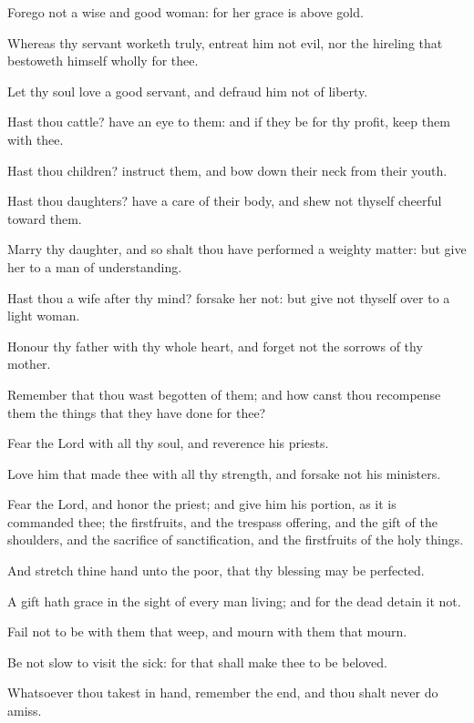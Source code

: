 {\par }{\PP {}Forego not a wise and good woman: for her grace is above gold.
\par }{\PP {}Whereas thy servant worketh truly, entreat him not evil, nor the hireling that bestoweth himself wholly for thee.
\par }{\PP {}Let thy soul love a good servant, and defraud him not of liberty.
\par }{\PP {}Hast thou cattle? have an eye to them: and if they be for thy profit, keep them with thee.
\par }{\PP {}Hast thou children? instruct them, and bow down their neck from their youth.
\par }{\PP {}Hast thou daughters? have a care of their body, and shew not thyself cheerful toward them.
\par }{\PP {}Marry thy daughter, and so shalt thou have performed a weighty matter: but give her to a man of understanding.
\par }{\PP {}Hast thou a wife after thy mind? forsake her not: but give not thyself over to a light woman.
\par }{\PP {}Honour thy father with thy whole heart, and forget not the sorrows of thy mother.
\par }{\PP {}Remember that thou wast begotten of them; and how canst thou recompense them the things that they have done for thee?
\par }{\PP {}Fear the Lord with all thy soul, and reverence his priests.
\par }{\PP {}Love him that made thee with all thy strength, and forsake not his ministers.
\par }{\PP {}Fear the Lord, and honor the priest; and give him his portion, as it is commanded thee; the firstfruits, and the trespass offering, and the gift of the shoulders, and the sacrifice of sanctification, and the firstfruits of the holy things.
\par }{\PP {}And stretch thine hand unto the poor, that thy blessing may be perfected.
\par }{\PP {}A gift hath grace in the sight of every man living; and for the dead detain it not.
\par }{\PP {}Fail not to be with them that weep, and mourn with them that mourn.
\par }{\PP {}Be not slow to visit the sick: for that shall make thee to be beloved.
\par }{\PP {}Whatsoever thou takest in hand, remember the end, and thou shalt never do amiss.

}
